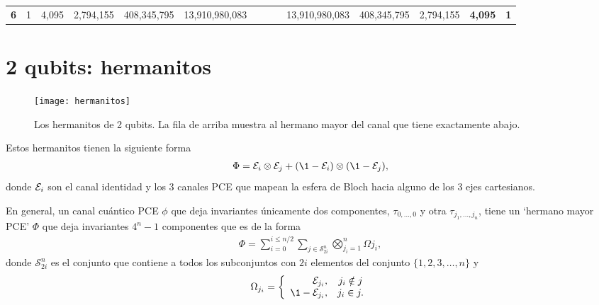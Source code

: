 \begin{table}[h!]
\begin{tabular}{llllccccccclll}
{\color[HTML]{FF0000} \textbf{6}} & \multicolumn{1}{c}{1} & \multicolumn{1}{c}{4,095} & \multicolumn{1}{c}{2,794,155}  & 408,345,795          & 13,910,980,083                     & \multicolumn{1}{l}{}                 & \multicolumn{1}{l}{}                   & \multicolumn{1}{l}{}                    & \cellcolor[HTML]{FCE5CD}13,910,980,083  & \cellcolor[HTML]{CFE2F3}408,345,795 & \multicolumn{1}{c}{\cellcolor[HTML]{FCE5CD}2,794,155} & \multicolumn{1}{c}{\textbf{4,095}} & \multicolumn{1}{c}{\textbf{1}}
\end{tabular}
\end{table}

\section{2 qubits: hermanitos}
\begin{figure}[H]
  \centering
  \texttt{[image: hermanitos]}
  \caption{Los hermanitos de 2 qubits. La fila de arriba muestra al hermano 
  mayor del canal que tiene exactamente abajo.}
  \label{•}
\end{figure}

Estos hermanitos tienen la siguiente forma
\begin{align}
\Phi=\E_i\ot \E_j+\qty(\1-\E_i)\ot \qty(\1-\E_j),
\end{align}
donde $\mathcal{E}_i$ son el canal identidad y los 3 canales PCE que mapean 
la esfera de Bloch hacia alguno de los 3 ejes cartesianos.

En general, un canal cuántico PCE $\phi$ que deja invariantes únicamente 
dos componentes, $\tau_{0,\ldots,0}$ y otra $\tau_{j_1,\ldots,j_n}$,
tiene un `hermano mayor PCE' $\Phi$ que deja invariantes $4^n-1$
componentes que es de la forma
\begin{align}
\Phi=\sum_{i=0}^{i\leq n/2}
\sum_{j\in \mathcal{S}_{2i}^n}
\bigotimes_{j_i=1}^n\Omega{j_i},
\end{align}
donde $\mathcal{S}_{2i}^n$ es el conjunto que contiene 
a todos los subconjuntos con $2i$ elementos del 
conjunto \newline $\{ 1,2,3,\ldots,n \}$ y
\begin{align}
\Omega_{j_i}= \left\{ \begin{array}{rc}
             \E_{j_i}, & j_i \notin j \\
             \1 -\E_{j_i}, & j_i \in j.
             \end{array}
   \right.
\end{align}

